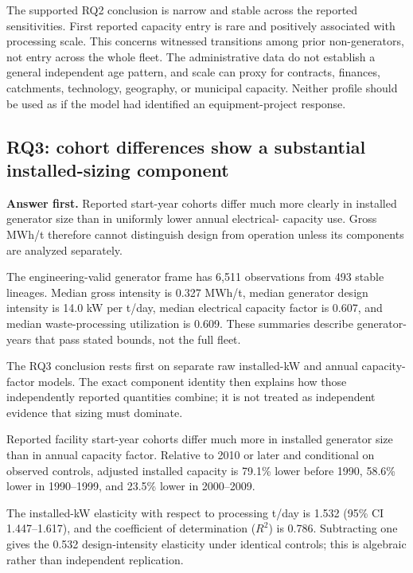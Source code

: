 \documentclass[12pt,a4paper]{article}
\begin{document}
The supported RQ2 conclusion is narrow and stable across the reported
sensitivities. First reported capacity entry is rare and positively associated
with processing scale. This concerns witnessed
transitions among prior non-generators, not entry across the whole fleet. The
administrative data do not establish a general independent age pattern, and
scale can proxy for contracts, finances, catchments, technology, geography, or
municipal capacity. Neither profile should be used as if the model had
identified an equipment-project response.

\FloatBarrier
\subsection{RQ3: cohort differences show a substantial installed-sizing component}

\noindent\textbf{Answer first.} Reported start-year cohorts differ much more
clearly in installed generator size than in uniformly lower annual electrical-
capacity use. Gross MWh/t therefore cannot distinguish design from operation
unless its components are analyzed separately.

The engineering-valid generator frame has 6,511 observations from 493 stable
lineages. Median gross intensity is 0.327 MWh/t, median generator design
intensity is 14.0 kW per t/day, median electrical capacity factor is 0.607, and
median waste-processing utilization is 0.609. These summaries describe
generator-years that pass stated bounds, not the full fleet.

The RQ3 conclusion rests first on separate raw installed-kW and annual capacity-
factor models. The exact component identity then explains how those independently
reported quantities combine; it is not treated as independent evidence that
sizing must dominate.

Reported facility start-year cohorts differ much more in installed generator
size than in annual capacity factor. Relative to 2010 or later and conditional on observed
controls, adjusted installed capacity is 79.1\% lower before 1990, 58.6\% lower
in 1990--1999, and 23.5\% lower in 2000--2009.

The installed-kW elasticity with respect to processing t/day is 1.532 (95\% CI
1.447--1.617), and the coefficient of determination ($R^2$) is 0.786.
Subtracting one gives the 0.532
design-intensity elasticity under identical controls; this is algebraic rather
than independent replication.
\end{document}
